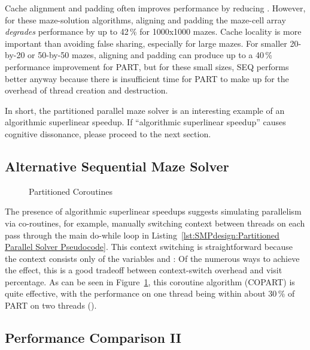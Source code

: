 Cache alignment and padding often improves performance by reducing
.
However, for these maze-solution algorithms, aligning and padding the
maze-cell array \emph{degrades} performance by up to 42\,\% for 1000x1000 mazes.
Cache locality is more important than avoiding
false sharing, especially for large mazes.
For smaller 20-by-20 or 50-by-50 mazes, aligning and padding can produce
up to a 40\,\% performance improvement for PART,
but for these small sizes, SEQ performs better anyway because there
is insufficient time for PART to make up for the overhead of
thread creation and destruction.

In short, the partitioned parallel maze solver is an interesting example
of an algorithmic superlinear speedup.
If ``algorithmic superlinear speedup'' causes cognitive dissonance,
please proceed to the next section.

\subsection{Alternative Sequential Maze Solver}
\label{sec:SMPdesign:Alternative Sequential Maze Solver}

\begin{figure}
\centering
{}
\caption{Partitioned Coroutines}
\label{fig:SMPdesign:Partitioned Coroutines}
\end{figure}

The presence of algorithmic superlinear speedups suggests simulating
parallelism via co-routines, for example, manually switching context
between threads on each pass through the main do-while loop in
Listing~\ref{lst:SMPdesign:Partitioned Parallel Solver Pseudocode}.
This context switching is straightforward because the context
consists only of the variables  and : Of the numerous
ways to achieve the effect, this is a good tradeoff between
context-switch overhead and visit percentage.
As can be seen in
Figure~\ref{fig:SMPdesign:Partitioned Coroutines},
this coroutine algorithm (COPART) is quite effective, with the performance
on one thread being within about 30\,\% of PART on two threads
().

\subsection{Performance Comparison II}
\label{sec:SMPdesign:Performance Comparison II}

